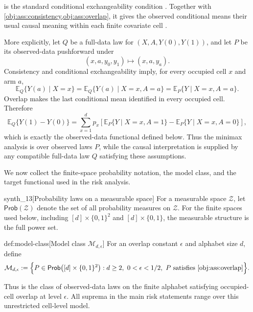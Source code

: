 \documentclass[11pt]{article}
\begin{document}
 is the standard conditional exchangeability condition \citep{ZengBalakrishnanHanKennedy2024}. Together with \cref{obj:ass:consistency,obj:ass:overlap}, it gives the observed conditional means their usual causal meaning within each finite covariate cell \citep{RosenbaumRubin1983,ImbensRubin2015}.

More explicitly, let \(Q\) be a full-data law for
\((X,A,Y(0),Y(1))\), and let \(P\) be its observed-data pushforward under
\[
(x,a,y_0,y_1)\longmapsto (x,a,y_a).
\]
Consistency and conditional exchangeability imply, for every occupied cell \(x\) and arm \(a\),
\[
\mathbb E_Q\{Y(a)\mid X=x\}
=
\mathbb E_Q\{Y(a)\mid X=x,A=a\}
=
\mathbb E_P\{Y\mid X=x,A=a\}.
\]
Overlap makes the last conditional mean identified in every occupied cell. Therefore
\[
\mathbb E_Q\{Y(1)-Y(0)\}
=
\sum_{x=1}^d p_x
\left[
\mathbb E_P\{Y\mid X=x,A=1\}
-
\mathbb E_P\{Y\mid X=x,A=0\}
\right],
\]
which is exactly the observed-data functional defined below. Thus the minimax analysis is over observed laws \(P\), while the causal interpretation is supplied by any compatible full-data law \(Q\) satisfying these assumptions.

We now collect the finite-space probability notation, the model class, and the target functional used in the risk analysis.

\begin{definitionv}{synth_13}[Probability laws on a measurable space]
For a measurable space \(\mathcal Z\), let \(\mathsf{Prob}(\mathcal Z)\) denote the set of all probability measures on \(\mathcal Z\). For the finite spaces used below, including \([d]\times\{0,1\}^2\) and \([d]\times\{0,1\}\), the measurable structure is the full power set.
\end{definitionv}

\begin{definitionv}{def:model-class}[Model class \(\mathcal M_{d,\epsilon}\)]
For an overlap constant \(\epsilon\) and alphabet size \(d\), define
\[
\mathcal M_{d,\epsilon}
:=
\Bigl\{
P\in\mathsf{Prob}\bigl([d]\times\{0,1\}^2\bigr):
d\ge2,\ 0<\epsilon<1/2,\ \text{\(P\) satisfies \cref{obj:ass:overlap}}
\Bigr\}.
\]
\end{definitionv}

Thus  is the class of observed-data laws on the finite alphabet satisfying occupied-cell overlap at level \(\epsilon\). All suprema in the main risk statements range over this unrestricted cell-level model.
\end{document}
